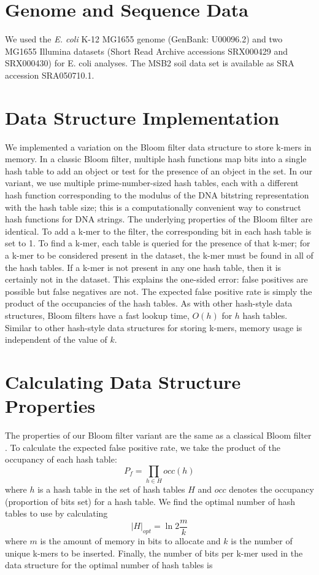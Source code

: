 \documentclass{pnastwo}
\begin{document}
\begin{article}
\begin{materials}

\section{Genome and Sequence Data}
We used the \emph{E. coli} K-12 MG1655 genome (GenBank: U00096.2) and
two MG1655 Illumina datasets (Short Read Archive accessions SRX000429
and SRX000430) for E. coli analyses.  The MSB2 soil data set is
available as SRA accession SRA050710.1.

\section{Data Structure Implementation}
We implemented a variation on the Bloom filter data structure to store
k-mers in memory. In a classic Bloom filter, multiple hash functions
map bits into a single hash table to add an object or test for the
presence of an object in the set. In our variant, we use multiple
prime-number-sized hash tables, each with a different hash function
corresponding to the modulus of the DNA bitstring representation with
the hash table size; this is a computationally convenient way to
construct hash functions for DNA strings.  The underlying properties
of the Bloom filter are identical.  To add a k-mer to the filter, the
corresponding bit in each hash table is set to 1.  To find a k-mer,
each table is queried for the presence of that k-mer; for a k-mer to
be considered present in the dataset, the k-mer must be found in all
of the hash tables.  If a k-mer is not present in any one hash table,
then it is certainly not in the dataset. This explains the one-sided
error: false positives are possible but false negatives are not. The
expected false positive rate is simply the product of the occupancies
of the hash tables.  As with other hash-style data structures, Bloom
filters have a fast lookup time, $O(h)$ for $h$ hash tables.  Similar
to other hash-style data structures for storing k-mers, memory usage
is independent of the value of $k$.

\section{Calculating Data Structure Properties}
The properties of our Bloom filter variant are the same as a classical
Bloom filter \cite{bloomsurvey}.  To calculate the expected false
positive rate, we take the product of the occupancy of each hash
table:
\begin{displaymath}
P_f = \prod_{h \in H} occ(h)
\end{displaymath}
where $h$ is a hash table in the set of hash tables $H$ and $occ$ denotes
the occupancy (proportion of bits set) for a hash table.
We find the optimal number of hash tables
to use by calculating
\begin{displaymath}
\vert H \vert_{opt} = \ln 2 \frac{m}{k}
\end{displaymath}
where $m$ is the amount of memory in bits to allocate and $k$
is the number of unique k-mers to be inserted. Finally,
the number of bits per
k-mer used in the data structure for the optimal number of hash 
tables is


\end{materials}
\end{article}
\end{document}
